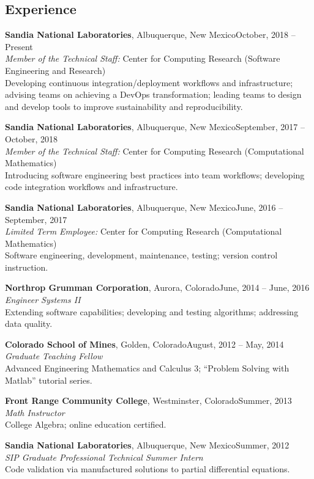 \documentclass[margin,line,pifont,palatino,10pt]{res}
\begin{document}
\begin{resume}
\vspace{1.5mm}
\section{\sc Experience}
{\bf Sandia National Laboratories}, Albuquerque, New Mexico\hfill October, 2018 -- Present\\
{\em Member of the Technical Staff:}  Center for Computing Research (Software Engineering and Research)\\
Developing continuous integration/deployment workflows and infrastructure; advising teams on achieving a DevOps transformation; leading teams to design and develop tools to improve sustainability and reproducibility.

{\bf Sandia National Laboratories}, Albuquerque, New Mexico\hfill September, 2017 -- October, 2018\\
{\em Member of the Technical Staff:}  Center for Computing Research (Computational Mathematics)\\
Introducing software engineering best practices into team workflows; developing code integration workflows and infrastructure.

{\bf Sandia National Laboratories}, Albuquerque, New Mexico\hfill June, 2016 -- September, 2017\\
{\em Limited Term Employee:}  Center for Computing Research (Computational Mathematics)\\
Software engineering, development, maintenance, testing; version control instruction.

{\bf Northrop Grumman Corporation}, Aurora, Colorado\hfill June, 2014 -- June, 2016\\
{\em Engineer Systems II}\\
Extending software capabilities; developing and testing algorithms; addressing data quality.

{\bf Colorado School of Mines}, Golden, Colorado\hfill August, 2012 -- May, 2014\\
{\em Graduate Teaching Fellow}\\
Advanced Engineering Mathematics and Calculus 3; ``Problem Solving with Matlab'' tutorial series.

{\bf Front Range Community College}, Westminster, Colorado\hfill Summer, 2013\\
{\em Math Instructor}\\
College Algebra; online education certified.

{\bf Sandia National Laboratories}, Albuquerque, New Mexico\hfill Summer, 2012\\
{\em SIP Graduate Professional Technical Summer Intern}\\
Code validation via manufactured solutions to partial differential equations.


\end{resume}
\end{document}
